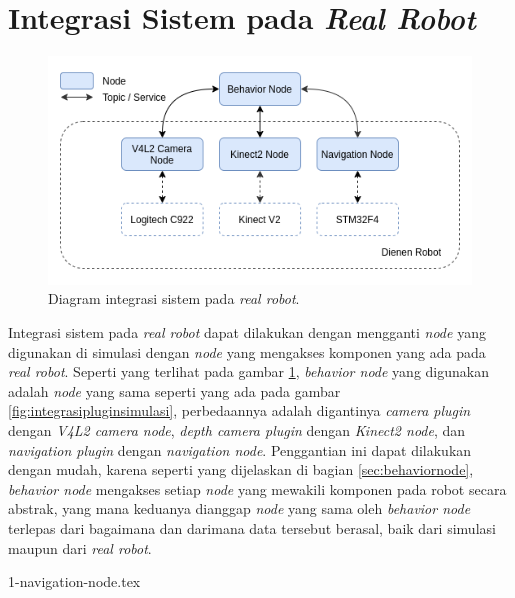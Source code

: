 \section{Integrasi Sistem pada \emph{Real Robot}}
\label{sec:integrasirobot}

\begin{figure}[ht]
  \centering
  \includegraphics[scale=0.55]{gambar/integrasi-real-robot.png}
  \caption{Diagram integrasi sistem pada \emph{real robot}.}
  \label{fig:integrasirealrobot}
\end{figure}

Integrasi sistem pada \emph{real robot} dapat dilakukan dengan mengganti \emph{node} yang digunakan di simulasi dengan \emph{node} yang mengakses komponen yang ada pada \emph{real robot}.
Seperti yang terlihat pada gambar \ref{fig:integrasirealrobot},
  \emph{behavior node} yang digunakan adalah \emph{node} yang sama seperti yang ada pada gambar \ref{fig:integrasipluginsimulasi},
  perbedaannya adalah digantinya \emph{camera plugin} dengan \emph{V4L2 camera node},
  \emph{depth camera plugin} dengan \emph{Kinect2 node},
  dan \emph{navigation plugin} dengan \emph{navigation node}.
Penggantian ini dapat dilakukan dengan mudah,
  karena seperti yang dijelaskan di bagian \ref{sec:behaviornode},
  \emph{behavior node} mengakses setiap \emph{node} yang mewakili komponen pada robot secara abstrak,
  yang mana keduanya dianggap \emph{node} yang sama oleh \emph{behavior node} terlepas dari bagaimana dan darimana data tersebut berasal,
  baik dari simulasi maupun dari \emph{real robot}.

{1-navigation-node.tex}
